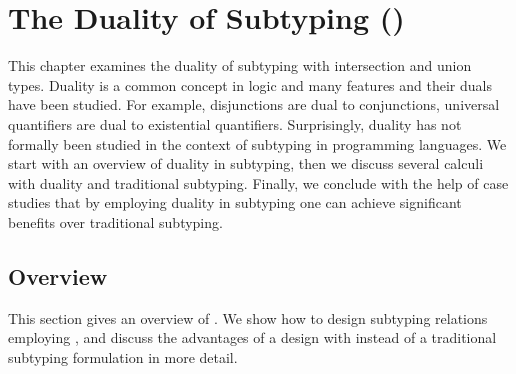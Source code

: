 
\chapter{The Duality of Subtyping (\nameduo)}
\label{chap:duo}

This chapter examines the duality of subtyping with 
intersection and union types. Duality is a common concept
in logic and many features and their duals have been studied. For example,
disjunctions are dual to conjunctions, universal quantifiers are dual to
existential quantifiers. Surprisingly, duality has not formally been
studied in the context of subtyping in programming languages. We start with
an overview of duality in subtyping, then we discuss several calculi
with duality and traditional subtyping. Finally, we conclude with
the help of case studies that by employing duality in subtyping one can achieve
significant benefits over traditional subtyping.






\section{Overview}
\label{sec:overview}

This section gives an overview of \nameduo. We show how to design subtyping
relations employing \nameduo, and discuss the advantages of a design with \nameduo
instead of a traditional subtyping formulation in more detail.



